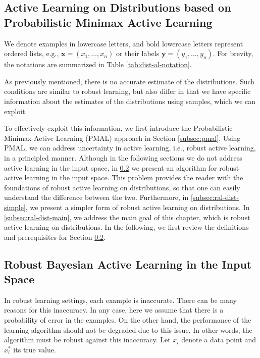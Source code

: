 \documentclass[12pt]{article}
\begin{document}
	\subsection{Active Learning on Distributions based on Probabilistic Minimax Active Learning}
	\label{subsec:proposed-method}
	
	We denote examples in lowercase letters, and bold lowercase letters represent ordered lists, e.g., $\mathbf{x} = (x_1, \ldots, x_n)$ or their labels $\mathbf{y} = (y_1, \ldots, y_n)$. For brevity, the notations are summarized in Table \ref{tab:dist-al-notation}.
	
	As previously mentioned, there is no accurate estimate of the distributions. Such conditions are similar to robust learning, but also differ in that we have specific information about the estimates of the distributions using samples, which we can exploit.
	
	To effectively exploit this information, we first introduce the Probabilistic Minimax Active Learning (PMAL) approach in Section \ref{subsec:pmal}. Using PMAL, we can address uncertainty in active learning, i.e., robust active learning, in a principled manner. Although in the following sections we do not address active learning in the input space, in \ref{subsec:ral-input} we present an algorithm for robust active learning in the input space. This problem provides the reader with the foundations of robust active learning on distributions, so that one can easily understand the difference between the two. Furthermore, in \ref{subsec:ral-dist-simple}, we present a simpler form of robust active learning on distributions. In \ref{subsec:ral-dist-main}, we address the main goal of this chapter, which is robust active learning on distributions. In the following, we first review the definitions and prerequisites for Section \ref{subsec:ral-input}.
	
	\subsection{Robust Bayesian Active Learning in the Input Space}
	\label{subsec:ral-input}
	
	In robust learning settings, each example is inaccurate. There can be many reasons for this inaccuracy. In any case, here we assume that there is a probability of error in the examples. On the other hand, the performance of the learning algorithm should not be degraded due to this issue. In other words, the algorithm must be robust against this inaccuracy. Let $x_i$ denote a data point and $x_i^*$ its true value.
	
\end{document}

